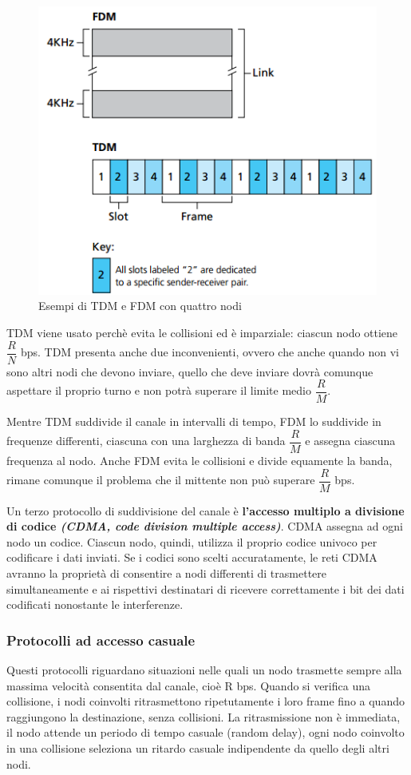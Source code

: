 \documentclass[11pt,a4paper]{article}
\begin{document}
\begin{figure}
	\begin{center}
		\includegraphics[scale=0.6]{img/077.png}
		\caption{Esempi di TDM e FDM con quattro nodi}
		\label{fig: 077}
	\end{center}
\end{figure}
TDM viene usato perchè evita le collisioni ed è imparziale: ciascun nodo ottiene $\dfrac{R}{N}$ bps. TDM presenta anche due inconvenienti, ovvero che anche quando non vi sono altri nodi che devono inviare, quello che deve inviare dovrà comunque aspettare il proprio turno e non potrà superare il limite medio $\dfrac{R}{M}$.

Mentre TDM suddivide il canale in intervalli di tempo, FDM lo suddivide in frequenze differenti, ciascuna con una larghezza di banda $\dfrac{R}{M}$ e assegna ciascuna frequenza al nodo. Anche FDM evita le collisioni e divide equamente la banda, rimane comunque il problema che il mittente non può superare $\dfrac{R}{M}$ bps.

Un terzo protocollo di suddivisione del canale è \textbf{l'accesso multiplo a divisione di codice \textit{(CDMA, code division multiple access)}}. CDMA assegna ad ogni nodo un codice. Ciascun nodo, quindi, utilizza il proprio codice univoco per codificare i dati inviati. Se i codici sono scelti accuratamente, le reti CDMA avranno la proprietà di consentire a nodi differenti di trasmettere simultaneamente e ai rispettivi destinatari di ricevere correttamente i bit dei dati codificati nonostante le interferenze.

\subsubsection{Protocolli ad accesso casuale}
Questi protocolli riguardano situazioni nelle quali un nodo trasmette sempre alla massima velocità consentita dal canale, cioè R bps. Quando si verifica una collisione, i nodi coinvolti ritrasmettono ripetutamente i loro frame fino a quando raggiungono la destinazione, senza collisioni. La ritrasmissione non è immediata, il nodo attende un periodo di tempo casuale (random delay), ogni nodo coinvolto in una collisione seleziona un ritardo casuale indipendente da quello degli altri nodi.
\end{document}
